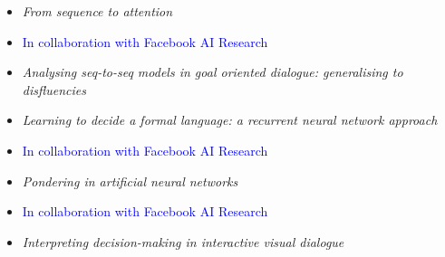 {{{{{{
{\begin{itemize}
  \item[] \textit{From sequence to attention}
  \item[] \textcolor{blue}{\normalfont In collaboration with Facebook AI Research\vspace{1mm}}
\end{itemize}
}

{
{\begin{itemize}
  \item[] \textit{Analysing seq-to-seq models in goal oriented dialogue: generalising to disfluencies}
\end{itemize}
}

{
{\begin{itemize}
  \item[] \textit{Learning to decide a formal language: a recurrent neural network approach}
  \item[] \textcolor{blue}{\normalfont In collaboration with Facebook AI Research\vspace{1mm}}
\end{itemize}
}

{
{\begin{itemize}
  \item[] \textit{Pondering in artificial neural networks}
  \item[] \textcolor{blue}{\normalfont In collaboration with Facebook AI Research\vspace{1mm}}
\end{itemize}}}

{
{\begin{itemize}
  \item[] \textit{Interpreting decision-making in interactive visual dialogue}
\end{itemize}}}

}}}}}}}}
